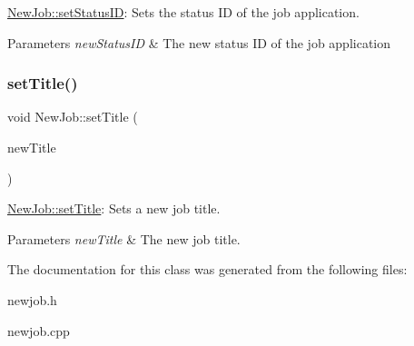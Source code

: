 \hyperlink{class_new_job_aa184d2046d0e60e82cd5840c40b99bed}{New\+Job\+::set\+Status\+ID}\+: Sets the status ID of the job application. 


\begin{DoxyParams}{Parameters}
{\em new\+Status\+ID} & The new status ID of the job application \\
\hline
\end{DoxyParams}
\mbox{\label{class_new_job_ae8c2b576f2ea6f444776e6d944f0d767}} 
\subsubsection{\texorpdfstring{set\+Title()}{setTitle()}}
{\footnotesize\ttfamily void New\+Job\+::set\+Title (\begin{DoxyParamCaption}\item[{Q\+String}]{new\+Title }\end{DoxyParamCaption})}



\hyperlink{class_new_job_ae8c2b576f2ea6f444776e6d944f0d767}{New\+Job\+::set\+Title}\+: Sets a new job title. 


\begin{DoxyParams}{Parameters}
{\em new\+Title} & The new job title. \\
\hline
\end{DoxyParams}


The documentation for this class was generated from the following files\+:\begin{DoxyCompactItemize}
\item 
newjob.\+h\item 
newjob.\+cpp\end{DoxyCompactItemize}
